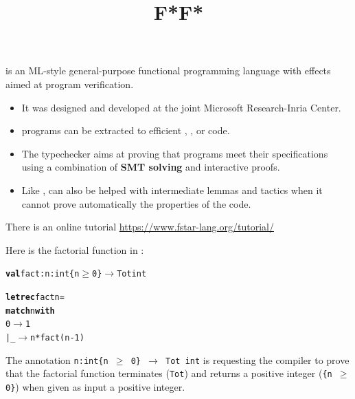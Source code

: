\documentclass[wide]{slides}
\begin{document}
\begin{slide}
  \title{F*}

  \Fstar is an \textsf{ML}-style general-purpose functional
  programming language with effects aimed at program verification.

  \begin{itemize}

    \item It was designed and developed at the joint Microsoft
      Research-Inria Center.

    \item \Fstar programs can be extracted to efficient \OCaml,
      \Fsharp, or \Clang code.

    \item The \Fstar typechecker aims at proving that programs meet
      their specifications using a combination of \textbf{SMT solving}
      and interactive proofs.

    \item Like \Coq, \Fstar can also be helped with intermediate
      lemmas and tactics when it cannot prove automatically the
      properties of the code.

  \end{itemize}

  There is an online tutorial
  \url{https://www.fstar-lang.org/tutorial/}
\end{slide}



\begin{slide}
  \title{F*}
   Here is the factorial function in \Fstar:

\begin{alltt}
\textbf{val} fact: n:int\{n \(\geqslant\) 0\} \(\rightarrow\) Tot int

\textbf{let rec} fact n =
  \textbf{match} n \textbf{with}
    0 \(\rightarrow\) 1
  | \_ \(\rightarrow\) n * fact (n-1)
\end{alltt}

The annotation \texttt{n:int\{n \(\geqslant\) 0\} \(\rightarrow\) Tot
  int} is requesting the \Fstar compiler to prove that the factorial
function terminates (\texttt{Tot}) and returns a positive integer
(\texttt{\{n \(\geqslant\) 0\}}) when given as input a positive
integer.

\end{slide}
\end{document}

